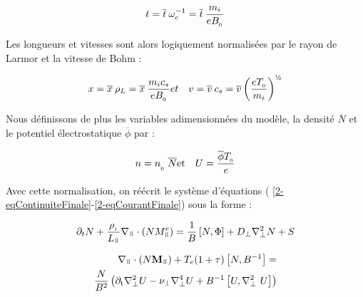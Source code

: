 \begin{refsection}
\begin{equation}
t = \overline{t}\:\omega_c^{{-1}} =
\overline{t}\:\frac{m_i}{eB_{_{0}}}
\end{equation}

Les longueurs et vitesses sont alors logiquement normalisées par le rayon de
Larmor et la vitesse de Bohm :

\begin{eqnarray}
x = \overline{x}\:\rho_L =
\overline{x}\:\frac{m_ic_s}{eB\indice{0}} &
et &
v=\overline{v}\:c_s=\overline{v}\left(\frac{eT\indice{0}}{m_i}\right)^{\text{\textonehalf}}
\end{eqnarray}

Nous définissons de plus les variables adimensionnées du modèle, la densité
$\overline{N}$ et le potentiel électrostatique $\overline \phi$ par :

\begin{eqnarray}
n = n_{_{_{0}}}\:\overline{N} & \text{et} & U=\frac{\overline
{\phi}T_{_{0}}}{e}
\end{eqnarray}

Avec cette normalisation, on réécrit le système d'équations (
\eqref{2-eqContinuiteFinale}-\eqref{2-eqCourantFinale}) sous la forme :

\begin{equation}
\label{2-eqContinuiteNorm}
\partial_t N +
\frac{\rho\indice{i}}{L_{\para}}\nabla_{\para}\cdot(NM^e_{\para}) =
\frac{1}{B}\left[N,\Phi\right] + D_\perp\nabla^2_\perp N + S
\end{equation}

\begin{equation}\begin{split}
\label{2-eqCourantNorm}
\nabla_\para\cdot(N\mathbf{M}_\para) +
T_e(1+\tau)\left[N,B\puissance{-1}\right] =\\
\frac{N}{B^2}\left(\partial_\text{t}\nabla_\perp^2 U - \nu_\perp
\nabla_\perp^4U+
B\puissance{-1}\left[U,\nabla_\perp^2\ U\right]\right)
\end{split}
\end{equation}




\end{refsection}
